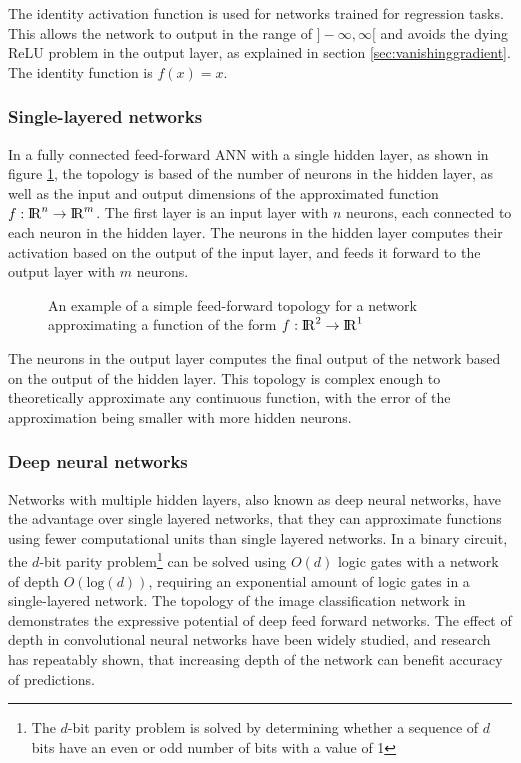 The identity activation function is used for networks trained for regression tasks. This allows the network to output in the range of $]-\infty,\infty[$ and avoids the dying ReLU problem in the output layer, as explained in section \ref{sec:vanishinggradient}. The identity function is $f(x) = x$.


\subsubsection{Single-layered networks}
In a fully connected feed-forward ANN with a single hidden layer, as shown in figure \ref{fig:fft}, the topology is based of the number of neurons in the hidden layer, as well as the input and output dimensions of the approximated function $f:{\rm I\!R}^n \rightarrow {\rm I\!R}^m$. The first layer is an input layer with $n$ neurons, each connected to each neuron in the hidden layer. The neurons in the hidden layer computes their activation based on the output of the input layer, and feeds it forward to the output layer with $m$ neurons.

\begin{figure}[H]
    \centering
    \vspace{-0.8cm}
    
    \caption[Simple feed-forward topology]{An example of a simple feed-forward topology for a network approximating a function of the form $f:{\rm I\!R}^2 \rightarrow {\rm I\!R}^1$}
    \label{fig:fft}
\end{figure}

The neurons in the output layer computes the final output of the network based on the output of the hidden layer. This topology is complex enough to theoretically approximate any continuous function, with the error of the approximation being smaller with more hidden neurons.

\subsubsection{Deep neural networks}
Networks with multiple hidden layers, also known as deep neural networks, have the advantage over single layered networks, that they can approximate functions using fewer computational units than single layered networks\cite{yoshua}. In a binary circuit, the $d$-bit parity problem\footnote{The $d$-bit parity problem is solved by determining whether a sequence of $d$ bits have an even or odd number of bits with a value of 1} can be solved using $O(d)$ logic gates with a network of depth $O(\text{log}(d))$, requiring an exponential amount of logic gates\cite{Yao} in a single-layered network. The topology of the image classification network in \cite{christian} demonstrates the expressive potential of deep feed forward networks. The effect of depth in convolutional neural networks have been widely studied, and research has repeatably shown, that increasing depth of the network can benefit accuracy of predictions\cite{karen}.

